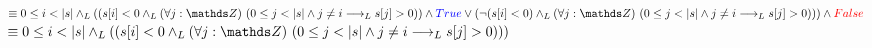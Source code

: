 \documentclass{article}
\begin{document}
$\equiv 0 \leq i < |s| \yLuego \\
((s[i] < 0 \yLuego \paraTodo[unalinea]{j}{\ent}{0 \leq j < |s| \land j \neq i \implicaLuego s[j] > 0}) \land \textcolor{blue}{True} \lor\\
(\lnot (s[i] < 0) \yLuego \paraTodo[unalinea]{j}{\ent}{0 \leq j < |s| \land j \neq i \implicaLuego s[j] > 0})) \land \textcolor{red}{False}$\\

$\equiv 0 \leq i < |s| \yLuego \\
((s[i] < 0 \yLuego \paraTodo[unalinea]{j}{\ent}{0 \leq j < |s| \land j \neq i \implicaLuego s[j] > 0}))$\\
\qedsymbol
\end{document}
